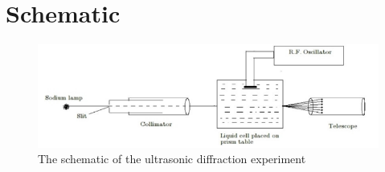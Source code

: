 \documentclass{article}
\begin{document}
\section{Schematic}

\begin{figure}[hbt!]
    \centering
    \includegraphics[scale = 0.65]{Figures/schematic.png}
    \captionsetup{justification=centering}
    \caption{The schematic of the ultrasonic diffraction experiment }
    \label{fig:schematic}
\end{figure}
\end{document}
